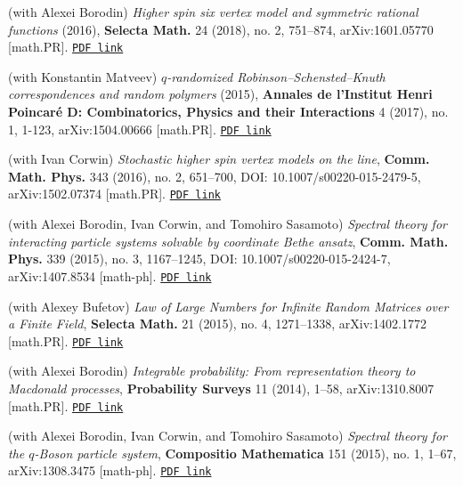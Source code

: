 \documentclass[letterpaper,11pt]{article}
\begin{document}
\begin{etaremune}
	      (with Alexei Borodin)
	      \emph{Higher spin six vertex model and symmetric rational
		      functions}
	      (2016),
				\textbf{Selecta Math.} 24 (2018), no. 2, 751--874,
	      arXiv:1601.05770 [math.PR].
		\href{https://storage.lpetrov.cc/research_files/Petrov-publ/20-publ-petrov-uva.pdf}{\texttt{PDF link}}
	\item
	      (with Konstantin Matveev)
	      \emph{$q$-randomized Robinson--Schensted--Knuth correspondences
		      and random polymers}
	      (2015),
	      \textbf{Annales de l'Institut Henri Poincar\'e D: Combina\-torics, Phy\-sics
				and their Interactions} 4 (2017), no. 1, 1-123, arXiv:1504.00666 [math.PR].
		\href{https://storage.lpetrov.cc/research_files/Petrov-publ/19-publ-petrov-uva.pdf}{\texttt{PDF link}}
	\item
	      (with Ivan Corwin)
	      \emph{Stochastic higher spin vertex models on the line},
				\textbf{Comm. Math. Phys.} 343 (2016), no. 2, 651--700, DOI:
	      10.1007/s00220-015-2479-5, arXiv:1502.07374 [math.PR].
		\href{https://storage.lpetrov.cc/research_files/Petrov-publ/18-publ-petrov-uva.pdf}{\texttt{PDF link}}
	\item
	      (with Alexei Borodin, Ivan Corwin, and Tomohiro Sasamoto)
	      \emph{Spectral theory for interacting particle systems solvable
		      by coordinate Bethe ansatz},
					\textbf{Comm. Math. Phys.} 339 (2015), no. 3, 1167--1245, DOI:
	      10.1007/s00220-015-2424-7, arXiv:1407.8534 [math-ph].
		\href{https://storage.lpetrov.cc/research_files/Petrov-publ/17-publ-petrov-uva.pdf}{\texttt{PDF link}}
	\item
	      (with Alexey Bufetov)
	      \emph{Law of Large Numbers for Infinite Random Matrices over a
		      Finite Field},
					\textbf{Selecta Math.} 21 (2015), no. 4, 1271--1338, arXiv:1402.1772
	      [math.PR].
		\href{https://storage.lpetrov.cc/research_files/Petrov-publ/16-publ-petrov.pdf}{\texttt{PDF link}}
	\item
	      (with Alexei Borodin)
	      \emph{Integrable probability: From representation theory to
		      Macdonald processes},
					\textbf{Probability Surveys} 11 (2014), 1--58, arXiv:1310.8007 [math.PR].
		\href{https://storage.lpetrov.cc/research_files/Petrov-publ/15-publ-petrov.pdf}{\texttt{PDF link}}
	\item
	      (with Alexei Borodin, Ivan Corwin, and Tomohiro Sasamoto)
	      \emph{Spectral theory for the $q$-Boson particle system},
				\textbf{Compositio Mathematica} 151 (2015), no. 1, 1--67, arXiv:1308.3475
	      [math-ph].
		\href{https://storage.lpetrov.cc/research_files/Petrov-publ/14-publ-petrov.pdf}{\texttt{PDF link}}

\end{etaremune}
\end{document}
